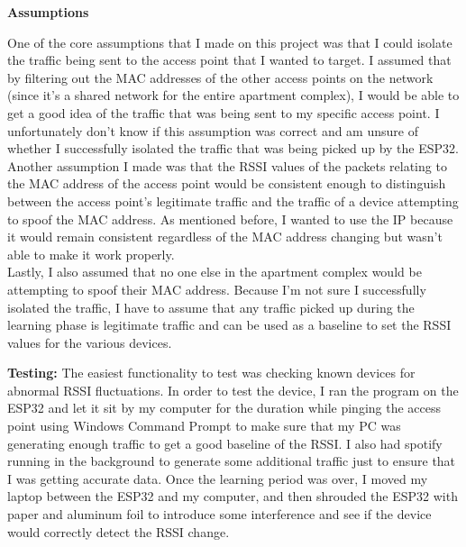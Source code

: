 \documentclass[letterpaper, 11pt]{article}
\newcommand{\secHeader}[1]{\vspace{2mm} \noindent \textbf{#1:}\vspace{-4mm}}
\begin{document}
\newpage
\vspace{5mm}
\noindent\textbf{Assumptions}

One of the core assumptions that I made on this project was that I could isolate the traffic being sent to the access point that I wanted to target. I assumed that by filtering out the MAC addresses
of the other access points on the network (since it's a shared network for the entire apartment complex), I would be able to get a good idea of the traffic that was being sent to my specific access point.
I unfortunately don't know if this assumption was correct and am unsure of whether I successfully isolated the traffic that was being picked up by the ESP32.
\\\indent Another assumption I made was that the RSSI values of the packets relating to the MAC address of the access point would be consistent enough to distinguish between the 
access point's legitimate traffic and the traffic of a device attempting to spoof the MAC address. As mentioned before, I wanted to use the IP because it would remain consistent regardless of the 
MAC address changing but wasn't able to make it work properly. 
\\\indent Lastly, I also assumed that no one else in the apartment complex would be attempting to spoof their MAC address. Because I'm not sure I successfully isolated the traffic, I have to assume 
that any traffic picked up during the learning phase is legitimate traffic and can be used as a baseline to set the RSSI values for the various devices.

\newpage
\secHeader{Testing}
\vspace{5mm}
The easiest functionality to test was checking known devices for abnormal RSSI fluctuations. In order to test the device, I ran the program on the ESP32 and let it sit by my computer for the duration 
while pinging the access point using Windows Command Prompt to make sure that my PC was generating enough traffic to get a good baseline of the RSSI. I also had spotify running in the background to 
generate some additional traffic just to ensure that I was getting accurate data. Once the learning period was over, I moved my laptop between the ESP32 and my computer, 
and then shrouded the ESP32 with paper and aluminum foil to introduce some interference and see if the device would correctly detect the RSSI change.
\end{document}
